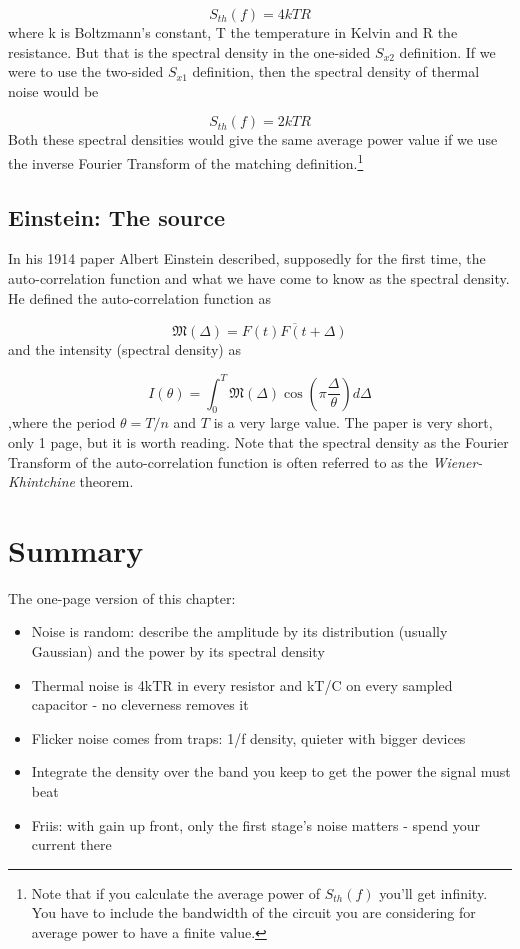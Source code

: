 \[S_{th}(f) = 4kTR\] where k is Boltzmann's constant, T the temperature
in Kelvin and R the resistance. But that is the spectral density in the
one-sided \(S_{x2}\) definition. If we were to use the two-sided
\(S_{x1}\) definition, then the spectral density of thermal noise would
be

\[S_{th}(f) = 2kTR\] Both these spectral densities would give the same
average power value if we use the inverse Fourier Transform of the
matching definition.\footnote{Note that if you calculate the average
  power of \(S_{th}(f)\) you'll get infinity. You have to include the
  bandwidth of the circuit you are considering for average power to have
  a finite value.}

\subsection{Einstein: The source}\label{einstein-the-source}

In his 1914 paper  Albert Einstein
described, supposedly for the first time, the auto-correlation function
and what we have come to know as the spectral density. He defined the
auto-correlation function as

\[\mathfrak{M} (\Delta) = \overline{F(t)F(t + \Delta)}\] and the
intensity (spectral density) as

\[I(\theta) =  \int_0^{T}{\mathfrak{M}(\Delta) \cos ( \pi \frac{\Delta}{\theta})d\Delta}\]
,where the period \(\theta = T/n\) and \(T\) is a very large value. The
paper is very short, only 1 page, but it is worth reading. Note that the
spectral density as the Fourier Transform of the auto-correlation
function is often referred to as the \emph{Wiener-Khintchine} theorem.

\section{Summary}\label{summary}

The one-page version of this chapter:

\begin{itemize}
\tightlist
\item
  Noise is random: describe the amplitude by its distribution (usually
  Gaussian) and the power by its spectral density
\item
  Thermal noise is 4kTR in every resistor and kT/C on every sampled
  capacitor - no cleverness removes it
\item
  Flicker noise comes from traps: 1/f density, quieter with bigger
  devices
\item
  Integrate the density over the band you keep to get the power the
  signal must beat
\item
  Friis: with gain up front, only the first stage's noise matters -
  spend your current there
\end{itemize}

